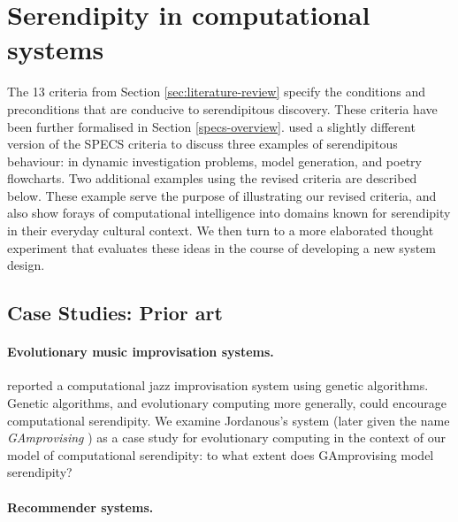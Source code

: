 \section{Serendipity in computational systems} \label{sec:computational-serendipity}

The 13 criteria from Section \ref{sec:literature-review} specify the
conditions and preconditions that are conducive to serendipitous
discovery.  These criteria have been further formalised
in Section \ref{specs-overview}.
% 
 used a slightly different version of the
SPECS criteria to discuss three examples of serendipitous behaviour:
in dynamic investigation problems, model generation, and poetry
flowcharts.  Two additional examples using the revised criteria are
described below.  These example serve the purpose of illustrating our
revised criteria, and also show forays of computational intelligence
into domains known for serendipity in their everyday cultural context.
We then turn to a more elaborated thought experiment that evaluates
these ideas in the course of developing a new system design.

% 

\subsection{Case Studies: Prior art}

\paragraph{Evolutionary music improvisation systems.}

 reported a computational jazz improvisation system using genetic algorithms. Genetic algorithms, and evolutionary computing more generally, could encourage computational serendipity. We examine Jordanous's system (later given the name {\em GAmprovising} \cite{jordanous:12}) as a case study for evolutionary computing in the context of our model of computational serendipity: to what extent does GAmprovising model serendipity?



\paragraph{Recommender systems.} 

